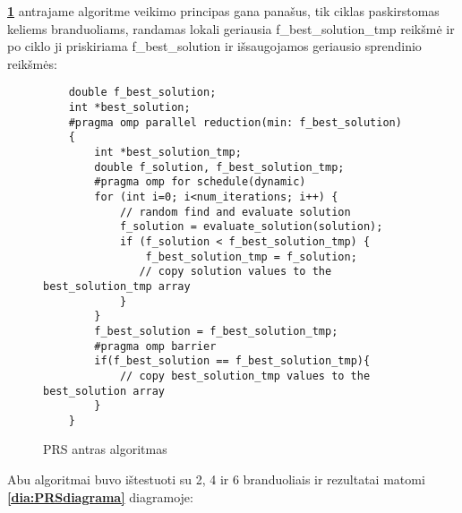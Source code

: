 \documentclass[a4paper,10pt]{article}
\begin{document}
\textbf{\ref{PRS2}} antrajame algoritme veikimo principas gana panašus, tik ciklas paskirstomas keliems branduoliams, randamas lokali geriausia f\_best\_solution\_tmp reikšmė ir po ciklo ji priskiriama f\_best\_solution ir išsaugojamos geriausio sprendinio reikšmės:
\begin{figure}[ht]
	\begin{verbatim}
    double f_best_solution;
    int *best_solution; 
    #pragma omp parallel reduction(min: f_best_solution) 
    {
        int *best_solution_tmp;
        double f_solution, f_best_solution_tmp;
        #pragma omp for schedule(dynamic)
        for (int i=0; i<num_iterations; i++) {
            // random find and evaluate solution
            f_solution = evaluate_solution(solution);
            if (f_solution < f_best_solution_tmp) {  
                f_best_solution_tmp = f_solution;  
               // copy solution values to the best_solution_tmp array
            }
        }
        f_best_solution = f_best_solution_tmp;  
        #pragma omp barrier
        if(f_best_solution == f_best_solution_tmp){
            // copy best_solution_tmp values to the best_solution array
        }
    }
\end{verbatim}
	\caption{PRS antras algoritmas}
	\label {PRS2}
\end{figure}

\newpage

Abu algoritmai buvo ištestuoti su 2, 4 ir 6 branduoliais ir rezultatai matomi \textbf{\ref{dia:PRSdiagrama}} diagramoje:
\end{document}
